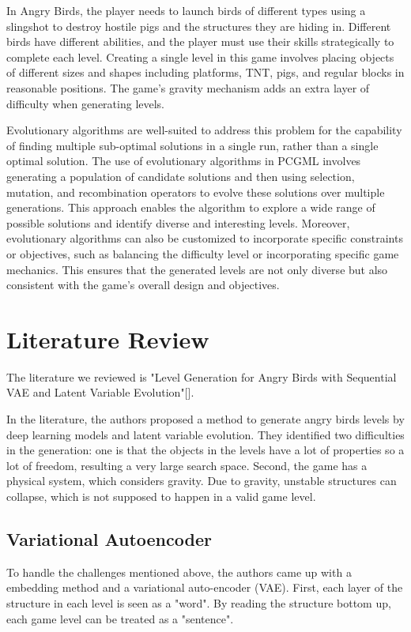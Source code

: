 \documentclass[manuscript,screen,review]{acmart}
\begin{document}
In Angry Birds, the player needs to launch birds of different types using a slingshot to destroy hostile pigs and the structures they are hiding in. Different birds have different abilities, and the player must use their skills strategically to complete each level. Creating a single level in this game involves placing objects of different sizes and shapes including platforms, TNT, pigs, and regular blocks in reasonable positions. The game's gravity mechanism adds an extra layer of difficulty when generating levels.

Evolutionary algorithms are well-suited to address this problem for the capability of finding multiple sub-optimal solutions in a single run, rather than a single optimal solution. The use of evolutionary algorithms in PCGML involves generating a population of candidate solutions and then using selection, mutation, and recombination operators to evolve these solutions over multiple generations. This approach enables the algorithm to explore a wide range of possible solutions and identify diverse and interesting levels. Moreover, evolutionary algorithms can also be customized to incorporate specific constraints or objectives, such as balancing the difficulty level or incorporating specific game mechanics. This ensures that the generated levels are not only diverse but also consistent with the game's overall design and objectives.

\section{Literature Review}

The literature we reviewed is "Level Generation for Angry Birds with Sequential VAE and Latent Variable Evolution"[].

In the literature, the authors proposed a method to generate angry birds levels by deep learning models and latent variable evolution. They identified two difficulties in the generation: one is that the objects in the levels have a lot of properties so a lot of freedom, resulting a very large search space. Second, the game has a physical system, which considers gravity. Due to gravity, unstable structures can collapse, which is not supposed to happen in a valid game level.

\subsection{Variational Autoencoder}

To handle the challenges mentioned above, the authors came up with a embedding method and a variational auto-encoder (VAE). First, each layer of the structure in each level is seen as a "word". By reading the structure bottom up, each game level can be treated as a "sentence". 
\end{document}
